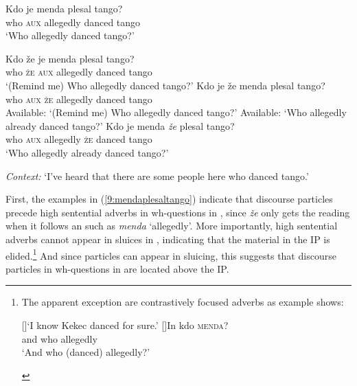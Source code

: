 \documentclass[output=paper,modfonts,newtxmath,hidelinks]{langscibook}
\begin{document}
\begin{exe}
\ex \gll Kdo je menda plesal tango?\\
         who \textsc{aux} allegedly danced tango\\
 \trans `Who allegedly danced tango?'
\ex \label{9:mendaplesaltango}
\begin{xlist}
 \ex \gll	Kdo že je menda plesal tango?\\
 who \textsc{že} \textsc{aux} allegedly danced tango\\
\trans `(Remind me) Who allegedly danced tango?'
\ex \gll	Kdo je že menda plesal tango?\\
 who \textsc{aux} \textsc{že}  allegedly danced tango\\
 \glt Available: `(Remind me) Who allegedly danced tango?'
 \glt Available: `Who allegedly already danced tango?'
\ex \gll	Kdo je menda \textit{že} plesal tango?\\
 who \textsc{aux} allegedly \textsc{že} danced tango\\
\trans `Who allegedly already danced tango?'
\end{xlist}
\ex \textit{Context:} `I've heard that there are some people here who danced tango.'
\begin{xlist}
\end{xlist}
\end{exe}

\noindent First, the examples in (\ref{9:mendaplesaltango}) indicate that discourse particles precede high sentential adverbs in wh-questions in , since \textit{že} only gets the  reading when it follows an  such as \textit{menda} `allegedly'. More importantly, high sentential adverbs cannot appear in sluices in , indicating that the material in the IP is elided.\footnote{The apparent exception are contrastively focused adverbs as example  shows:

\ea \label{9:fn16exi}
\begin{xlist}
[]{`I know Kekec danced for sure.'}
[]{\gll In kdo \textsc{menda}?\\
and who allegedly\\
\glt `And who (danced) allegedly?'}
\end{xlist}
\zlast} And since particles can appear in sluicing, this suggests that discourse particles in wh-questions in  are located above the IP.
\end{document}
